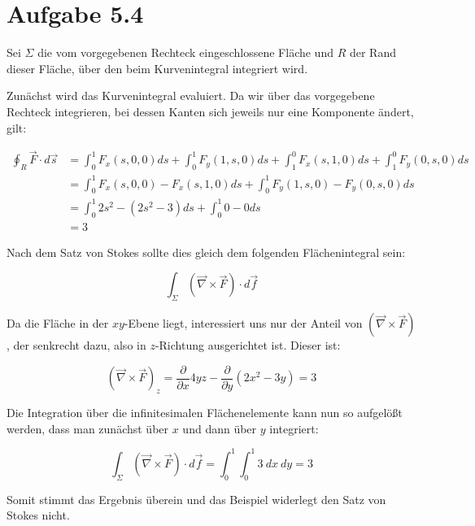 \documentclass{theozettel}
\begin{document}
\newpage
\section*{Aufgabe 5.4}

Sei $\Sigma$ die vom vorgegebenen Rechteck eingeschlossene Fläche und $R$ der Rand dieser Fläche, über den beim Kurvenintegral integriert wird.

Zunächst wird das Kurvenintegral evaluiert. Da wir über das vorgegebene Rechteck integrieren, bei dessen Kanten sich jeweils nur eine Komponente ändert, gilt:

\begin{align}
\oint_R \vec{F} \cdot d \vec{s} &= \int_0^{1} F_x(s,0,0) ds + \int_0^{1} F_y(1,s,0) ds + \int_1^{0} F_x(s,1,0) ds + \int_1^{0} F_y(0,s,0) ds \\
&= \int_0^{1} F_x(s,0,0) - F_x(s,1,0) ds + \int_0^{1} F_y(1,s,0) - F_y(0,s,0) ds \\
&=  \int_0^{1} 2s^{2} - (2s^{2} - 3) ds + \int_0^{1} 0-0 ds \\
&= 3
\end{align}

Nach dem Satz von Stokes sollte dies gleich dem folgenden Flächenintegral sein:

$$
\int_\Sigma (\vec{\nabla} \times \vec{F}) \cdot d \vec{f}
$$

Da die Fläche in der $xy$-Ebene liegt, interessiert uns nur der Anteil von $(\vec{\nabla} \times \vec{F})$, der senkrecht dazu, also in $z$-Richtung ausgerichtet ist. Dieser ist:

$$
(\vec{\nabla} \times \vec{F})_z = \frac{\partial}{\partial x} 4yz - \frac{\partial}{\partial y} (2x^{2} - 3y) = 3
$$

Die Integration über die infinitesimalen Flächenelemente kann nun so aufgelößt werden, dass man zunächst über $x$ und dann über $y$ integriert:

$$
\int_\Sigma (\vec{\nabla} \times \vec{F}) \cdot d \vec{f} = \int_0^{1}  \int_0^{1} 3\ dx\ dy = 3
$$

Somit stimmt das Ergebnis überein und das Beispiel widerlegt den Satz von Stokes nicht.
\end{document}
